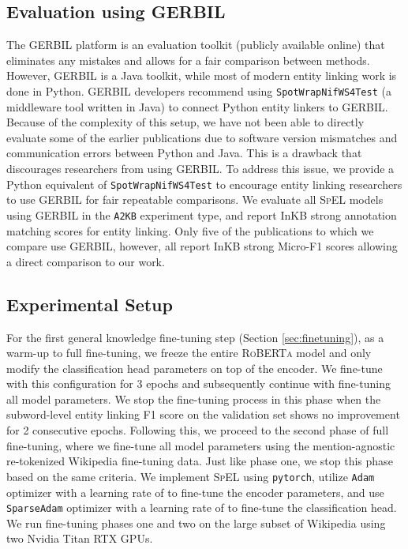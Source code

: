 \documentclass[11pt]{article}
\begin{document}
\subsection{Evaluation using GERBIL}
The GERBIL platform \cite{GERBIL} is an evaluation toolkit (publicly available online) that eliminates any mistakes and allows for a fair comparison between methods.
However, GERBIL is a Java toolkit, while most of modern entity linking work is done in Python. GERBIL developers recommend using \texttt{SpotWrapNifWS4Test} (a middleware tool written in Java) to connect Python entity linkers to GERBIL. Because of the complexity of this setup, we have not been able to directly evaluate some of the earlier publications due to software version mismatches and communication errors between Python and Java. This is a drawback that discourages researchers from using GERBIL. 
To address this issue, we provide a Python equivalent of \texttt{SpotWrapNifWS4Test} to encourage entity linking researchers to use GERBIL for fair repeatable comparisons.
We evaluate all \textsc{SpEL} models using GERBIL in the \texttt{A2KB} experiment type, and report InKB strong annotation matching scores for entity linking. Only five of the publications to which we compare use GERBIL, however, all report InKB strong Micro-F1 scores allowing a direct comparison to our work.

\subsection{Experimental Setup}

For the first general knowledge fine-tuning step (Section \ref{sec:finetuning}), as a warm-up to full fine-tuning, we freeze the entire \textsc{RoBERTa} model and only modify the classification head parameters on top of the encoder. We fine-tune with this configuration for 3 epochs and subsequently continue with fine-tuning all model parameters. We stop the fine-tuning process in this phase when the subword-level entity linking F1 score on the validation set shows no improvement for 2 consecutive epochs. Following this, we proceed to the second phase of full fine-tuning, where we fine-tune all model parameters using the mention-agnostic re-tokenized Wikipedia fine-tuning data. Just like phase one, we stop this phase based on the same criteria. We implement \textsc{SpEL} using \texttt{pytorch}, utilize \texttt{Adam} optimizer with a learning rate of  to fine-tune the encoder parameters, and use \texttt{SparseAdam} optimizer with a learning rate of  to fine-tune the classification head. We run fine-tuning phases one and two on the large subset of Wikipedia using two Nvidia Titan RTX GPUs.
\end{document}

